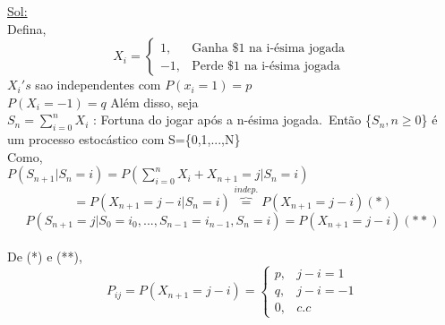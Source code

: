 \documentclass[a4paper,12pt]{article}
\begin{document}
\underline{Sol:}\\
Defina,
\begin{equation*}
X_i=
\begin{cases}
1, & \text{Ganha \$1 na i-\'esima jogada}\ \\
-1, & \text{Perde \$1 na i-\'esima jogada}
\end{cases}
\end{equation*}
$X_i's$ sao independentes com $P(x_i=1)=p$  \\$P(X_i=-1) = q$
Al\'em disso, seja\\
$S_n=\mathop\sum\limits_{i=0}^{n} X_i$ : Fortuna do jogar ap\'os a n-\'esima jogada.\
Ent\~ao \{$S_n,n\ge0$\} \'e um processo estoc\'astico com S=\{0,1,...,N\}\\
Como,\\
$P(S_{n+1}|S_n=i)=P(\mathop\sum\limits_{i=0}^{n} X_i+X_{n+1}=j|S_{n}=i)$\\
$$=P(X_{n+1}=j-i|S_n=i)\overbrace{=}^{indep.}P(X_{n+1}=j-i)(*)$$
$$P(S_{n+1}=j|S_0=i_0,...,S_{n-1}=i_{n-1},S_n=i)=P(X_{n+1}=j-i)(**)$$\\
\newpage
De (*) e (**),\\
\begin{equation*}
P_{ij}=P(X_{n+1}=j-i)=
\begin{cases}
p, & j-i=1\\
q, & j-i=-1\\
0, & c.c
\end{cases}
\end{equation*}
\end{document}

